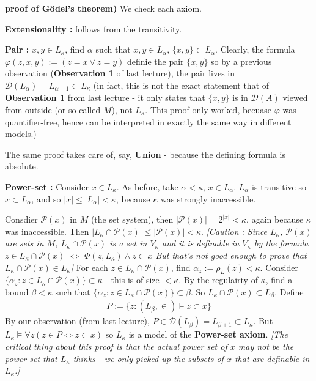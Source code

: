 \documentclass[12pt,a4paper]{article}
\newenvironment{proof}
{\begin{changemargin}{0.5cm}{0.5cm} 
	}%
	{\end{changemargin}
}
\newenvironment{p}
{\begin{proof} 
	}%
	{\end{proof}
}
\begin{document}
\begin{p}
\textbf{proof of G\"odel's theorem)} We check each axiom.

\quad \textbf{Extensionality :} follows from the transitivity. 

\quad \textbf{Pair :} $x,y\in L_{\kappa}$, find $\alpha$ such that $x, y\in L_{\alpha}$, $\{x,y\}\subset L_{\alpha}$. Clearly, the formula $\varphi(z, x,y) := (z=x\vee z=y)$ definie the pair $\{x,y\}$ so by a previous observation (\textbf{Observation 1} of last lecture), the pair lives in $\mathscr{D}(L_{\alpha})=L_{\alpha+1} \subset L_{\kappa}$ (in fact, this is not the exact statement that of \textbf{Observation 1} from last lecture - it only states that $\{x,y\}$ is in $\mathscr{D}(A)$ viewed from outside (or so called $M$), not $L_{\kappa}$. This proof only worked, becuase $\varphi$ was quantifier-free, hence can be interpreted in exactly the same way in different models.)

\quad The same proof takes care of, say, \textbf{Union} - because the defining formula is absolute.

\quad \textbf{Power-set :} Consider $x\in L_{\kappa}$. As before, take $\alpha < \kappa$, $x\in L_{\alpha}$. $L_{\alpha}$ is transitive so $x\subset L_{\alpha}$, and so $|x|\leq |L_{\alpha}| < \kappa$, because $\kappa$ was strongly inaccessible.

\quad Consdier $\mathscr{P}(x)$ in $M$ (the set system), then $|\mathscr{P}(x)| =2^{|x|} < \kappa$, again because $\kappa$ was inaccessible. Then $|L_{\kappa} \cap \mathscr{P}(x)| \leq |\mathscr{P}(x)| < \kappa$. \emph{[Caution : Since $L_{\kappa}$, $\mathscr{P}(x)$ are sets in $M$, $L_{\kappa} \cap \mathscr{P}(x)$ is a set in $V_{\kappa}$ and it is definable in $V_{\kappa}$ by the formula $z\in L_{\kappa}\cap \mathscr{P}(x)$ $\Leftrightarrow$ $\Phi(z, L_{\kappa})\wedge z\subset x$ But that's not good enough to prove that $L_{\kappa} \cap \mathscr{P}(x) \in L_{\kappa}$]} For each $z\in L_{\kappa} \cap \mathscr{P}(x)$, find $\alpha_z := \rho_L(z) < \kappa$. Consider $\{\alpha_z : z\in L_{\kappa}\cap \mathscr{P}(x) \} \subset \kappa$ - this is of size $<\kappa$. By the regulairty of $\kappa$, find a bound $\beta < \kappa$ such that $\{ \alpha_z : z\in L_{\kappa} \cap \mathscr{P}(x) \} \subset \beta$. So $L_{\kappa} \cap \mathscr{P}(x) \subset L_{\beta}$. Define
\begin{align*}
P:= \{z: (L_{\beta}, \in) \models z\subset x\}
\end{align*}
By our observation (from last lecture), $P\in \mathscr{D}(L_{\beta}) = L_{\beta+1} \subset L_{\kappa}$. But $L_{\kappa} \models \forall z(z\in P \Leftrightarrow z\subset x)$ so $L_{\kappa}$ is a model of the \textbf{Power-set axiom}. \emph{[The critical thing about this proof is that the actual power set of $x$ may not be the power set that $L_{\kappa}$ thinks - we only picked up the subsets of $x$ that are definable in $L_{\kappa}$.]}
\end{p}
\s
\end{document}

